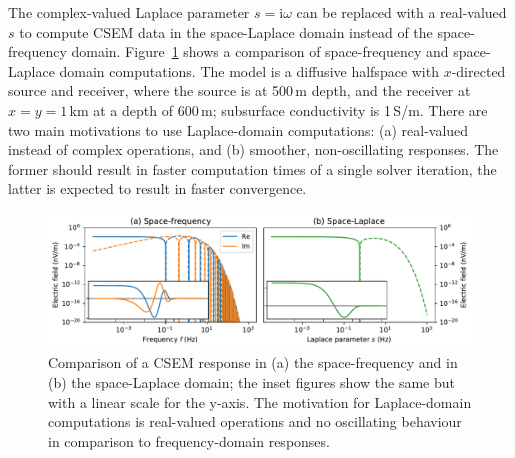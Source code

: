 \documentclass{eage2020}
\newcommand{\mr}[1]{\mathrm{#1}}
\begin{document}
The complex-valued Laplace parameter $s=\mr{i}\omega$ can be replaced with a
real-valued $s$ to compute CSEM data in the space-Laplace domain instead of the
space-frequency domain. Figure~\ref{fig:motivation} shows a comparison of
space-frequency and space-Laplace domain computations. The model is a diffusive
halfspace with $x$-directed source and receiver, where the source is at 500\,m
depth, and the receiver at $x=y=1\,$km at a depth of 600\,m; subsurface
conductivity is 1\,S/m. There are two main motivations to use Laplace-domain
computations: (a) real-valued instead of complex operations, and (b) smoother,
non-oscillating responses. The former should result in faster computation times
of a single solver iteration, the latter is expected to result in faster
convergence.
%
\begin{figure}[tb]
  \centering
  \includegraphics[width=\textwidth]{motivationcomparison}
  \caption{Comparison of a CSEM response in (a) the space-frequency and in (b)
    the space-Laplace domain; the inset figures show the same but with a linear
    scale for the y-axis. The motivation for Laplace-domain computations is
    real-valued operations and no oscillating behaviour in comparison to
    frequency-domain responses.}
  \label{fig:motivation}
\end{figure}
%
\end{document}
